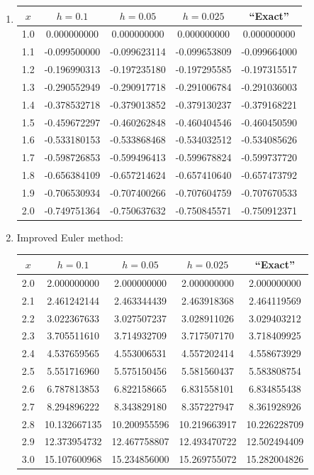 \documentclass[openany]{book}
\newenvironment{sectionSolutions}{
 \begin{enumerate}[item-label={\thesection.\arabic{enumi}.}]
}{
 \end{enumerate}
}
\begin{document}
\begin{sectionSolutions}
\item
{\small
{}
\begin{tabular}{S[table-format=1.1] *4{S[table-format=-1.9]}  }\toprule
{$x$}&{$h=0.1$}&{$h=0.05$}&{$h=0.025$}&{``Exact''}\\  &  0.000000000 &  0.000000000 &  0.000000000 &  0.000000000 \\
1.1 & -0.099500000 & -0.099623114 & -0.099653809 & -0.099664000 \\
1.2 & -0.196990313 & -0.197235180 & -0.197295585 & -0.197315517 \\
1.3 & -0.290552949 & -0.290917718 & -0.291006784 & -0.291036003 \\
1.4 & -0.378532718 & -0.379013852 & -0.379130237 & -0.379168221 \\
1.5 & -0.459672297 & -0.460262848 & -0.460404546 & -0.460450590 \\
1.6 & -0.533180153 & -0.533868468 & -0.534032512 & -0.534085626 \\
1.7 & -0.598726853 & -0.599496413 & -0.599678824 & -0.599737720 \\
1.8 & -0.656384109 & -0.657214624 & -0.657410640 & -0.657473792 \\
1.9 & -0.706530934 & -0.707400266 & -0.707604759 & -0.707670533 \\
2.0 & -0.749751364 & -0.750637632 & -0.750845571 & -0.750912371 \\
\bottomrule
\end{tabular}}\bigskip

\item
{\small Improved Euler method:
\begin{tabular}{S[table-format=1.1] *4{S[table-format=2.9]} }\toprule
{$x$}&{$h=0.1$}&{$h=0.05$}&{$h=0.025$}&{``Exact''}\\  &  2.000000000 &  2.000000000 &  2.000000000 &  2.000000000 \\
2.1 &  2.461242144 &  2.463344439 &  2.463918368 &  2.464119569 \\
2.2 &  3.022367633 &  3.027507237 &  3.028911026 &  3.029403212 \\
2.3 &  3.705511610 &  3.714932709 &  3.717507170 &  3.718409925 \\
2.4 &  4.537659565 &  4.553006531 &  4.557202414 &  4.558673929 \\
2.5 &  5.551716960 &  5.575150456 &  5.581560437 &  5.583808754 \\
2.6 &  6.787813853 &  6.822158665 &  6.831558101 &  6.834855438 \\
2.7 &  8.294896222 &  8.343829180 &  8.357227947 &  8.361928926 \\
2.8 & 10.132667135 & 10.200955596 & 10.219663917 & 10.226228709 \\
2.9 & 12.373954732 & 12.467758807 & 12.493470722 & 12.502494409 \\
3.0 & 15.107600968 & 15.234856000 & 15.269755072 & 15.282004826 \\
\bottomrule
\end{tabular}}\bigskip


\end{sectionSolutions}
\end{document}
